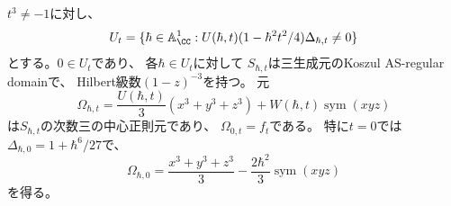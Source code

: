 \begin{theorem}[Hesse中心三次式の閉公式]
\label{thm:explicit-hesse-center}
$t^3\ne-1$に対し、
\begin{equation}
 U_t=\{\hbar\in\mathbb A^1_{\CC}:
   U(\hbar,t)(1-\hbar^2t^2/4)\Delta_{\hbar,t}\ne0\}
\end{equation}
とする。$0\in U_t$であり、
各$\hbar\in U_t$に対して
$S_{\hbar,t}$は三生成元のKoszul AS-regular domainで、
Hilbert級数$(1-z)^{-3}$を持つ。
元
\begin{equation}
 \boxed{\quad
 \Omega_{\hbar,t}=
   \frac{U(\hbar,t)}3(x^3+y^3+z^3)
   +W(\hbar,t)\operatorname{sym}(xyz)
 \quad}
 \label{eq:hesse-central-element}
\end{equation}
は$S_{\hbar,t}$の次数三の中心正則元であり、
$\Omega_{0,t}=f_t$である。
特に$t=0$では
$\Delta_{\hbar,0}=1+\hbar^6/27$で、
\begin{equation}
 \Omega_{\hbar,0}
 =\frac{x^3+y^3+z^3}{3}
   -\frac{2\hbar^2}{3}\operatorname{sym}(xyz)
\end{equation}
を得る。
\end{theorem}
